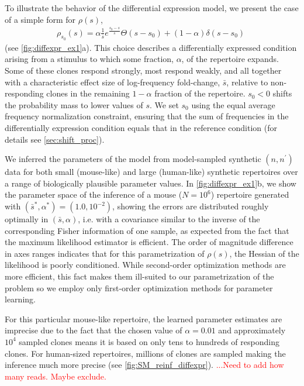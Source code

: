 \documentclass[letterpaper,english,prl,reprint,longbibliography]{revtex4-1} %
\newcommand{\re}[1]{\textcolor{red}{#1}}
\begin{document}
To illustrate the behavior of the differential expression model, we present the case of a simple form for $\rho(s)$,
\begin{align}
	\rho_{s_0}(s)=\alpha\frac{1}{\bar{s}}e^{\frac{s_0-s}{\bar{s}}} \Theta(s-s_0)+(1-\alpha)\delta(s-s_0)\; \label{eq:Ps_ex1}
\end{align} 
(see \cref{fig:diffexpr_ex1}a). 
This choice describes a differentially expressed condition arising from a stimulus to which some fraction, $\alpha$, of the repertoire expands. 
Some of these clones respond strongly, most respond weakly, and all together with a characteristic effect size of log-frequency fold-change, $\bar{s}$, relative to non-responding clones in the remaining $1-\alpha$ fraction of the repertoire. 
$s_0<0$ shifts the probability mass to lower values of $s$. 
We set $s_0$ using the equal average frequency normalization constraint, ensuring that the sum of frequencies in the differentially expression condition equals that in the reference condition (for details see \cref{sec:shift_proc}).

We inferred the parameters of the model from model-sampled synthetic $(n,n^{\prime})$ data for both small (mouse-like) and large (human-like) synthetic repertoires over a range of biologically plausible parameter values. 
In \cref{fig:diffexpr_ex1}b, we show the parameter space of the inference of a mouse ($N=10^{6}$) repertoire generated with $(\bar{s}^*,\alpha^* )=(1.0,10^{-2})$, showing the errors are distributed roughly optimally in $(\bar{s},\alpha)$, i.e. with a covariance similar to the inverse of the corresponding Fisher information of one sample, as expected from the fact that the maximum likelihood estimator is efficient. The order of magnitude difference in axes ranges indicates that for this parametrization of $\rho(s)$, the Hessian of the likelihood is poorly conditioned. While second-order optimization methods are more efficient, this fact makes them ill-suited to our parametrization of the problem so we employ only first-order optimization methods for parameter learning.

For this particular mouse-like repertoire, the learned parameter estimates are imprecise due to the fact that the chosen value of $\alpha=0.01$ and approximately $10^4$ sampled clones means it is based on only tens to hundreds of responding clones. For human-sized repertoires, millions of clones are sampled making the inference much more precise (see \cref{fig:SM_reinf_diffexpr}). \re{...Need to add how many reads. Maybe exclude.}
\end{document}
